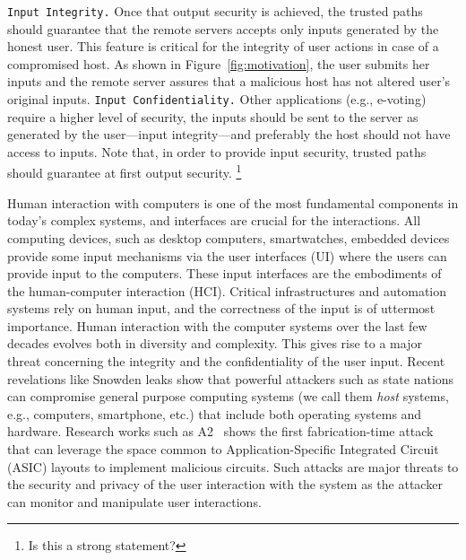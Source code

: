 \texttt{Input Integrity.} Once that output security is achieved, the trusted paths should guarantee that the remote servers accepts only inputs generated by the honest user. This feature is critical for the integrity of user actions in case of a compromised host. As shown in Figure~\ref{fig:motivation}, the user submits her inputs and the remote server assures that a malicious host has not altered user's original inputs. \texttt{Input Confidentiality.} Other applications (e.g., e-voting) require a higher level of security, the inputs should be sent to the server as generated by the user---input integrity---and preferably the host should not have access to inputs. Note that, in order to provide input security, trusted paths should guarantee at first output security. \footnote{Is this a strong statement?}

Human interaction with computers is one of the most fundamental components in today's complex systems, and interfaces are crucial for the interactions. All computing devices, such as desktop computers, smartwatches, embedded devices provide some input mechanisms via the user interfaces (UI) where the users can provide input to the computers. These input interfaces are the embodiments of the human-computer interaction (HCI). Critical infrastructures and automation systems rely on human input, and the correctness of the input is of uttermost importance. Human interaction with the computer systems over the last few decades evolves both in diversity and complexity. This gives rise to a major threat concerning the integrity and the confidentiality of the user input. Recent revelations like Snowden leaks show that powerful attackers such as state nations can compromise general purpose computing systems (we call them \emph{host} systems, e.g., computers, smartphone, etc.) that include both operating systems and hardware. Research works such as A2~\cite{A2} shows the first fabrication-time attack that can leverage the space common to Application-Specific Integrated Circuit (ASIC) layouts to implement malicious circuits. Such attacks are major threats to the security and privacy of the user interaction with the system as the attacker can monitor and manipulate user interactions. 
